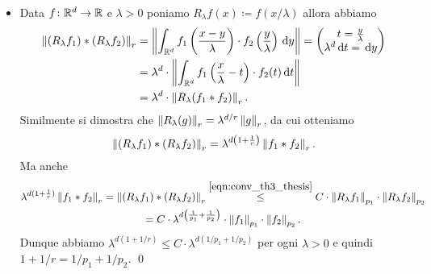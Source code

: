 \begin{itemize}
\begin{itemize}


		\item Data $f \colon \mathbb R^d \to \mathbb R$ e $\lambda > 0$ poniamo $R_{\lambda} f(x) \coloneqq f(x / \lambda)$ allora abbiamo
		\begin{align*}
			\left\lVert (R_\lambda f_1) \ast (R_\lambda f_2) \right\rVert_r
			& = \left\lVert \int_{\mathbb R^d} f_1 \left( \frac{x-y}{\lambda} \right) \cdot f_2\left( \frac{y}{\lambda} \right) \,\mathrm{d} y \right\rVert 
			= 
			\begin{pmatrix}
				t = \frac{y}{\lambda} \\
				\lambda^d \,\mathrm{d} t = \,\mathrm{d} y
			\end{pmatrix} \\
			& = \lambda^d \cdot \left\lVert \int_{\mathbb R^d} f_1 \left( \frac{x}{\lambda} - t \right) \cdot f_2(t) \,\mathrm{d} t \right\rVert \\
			& = \lambda^d \cdot \left\lVert R_\lambda (f_1 \ast f_2) \right\rVert_r.
		\end{align*}
		Similmente si dimostra che $\left\lVert R_\lambda(g) \right\rVert_r = \lambda^{d/r} \left\lVert g \right\rVert_r$, da cui otteniamo
		$$
			\left\lVert (R_\lambda f_1) \ast (R_\lambda f_2) \right\rVert_r 
			= \lambda^{d \left( 1 + \frac{1}{r} \right)} \left\lVert f_1 \ast f_2 \right\rVert_r.
		$$
		Ma anche
		\begin{multline*}
			\lambda^{d(1 + \frac{1}{r})} \left\lVert f_1 \ast f_2 \right\rVert_r
			= \left\lVert (R_\lambda f_1) \ast (R_\lambda f_2) \right\rVert_r 
			\overset{\eqref{eqn:conv_th3_thesis}}{\leq} C \cdot \left\lVert R_\lambda f_1 \right\rVert_{p_1} \cdot \left\lVert R_\lambda f_2 \right\rVert_{p_2} \\
			= C \cdot \lambda^{d \left( \frac{1}{p_1} + \frac{1}{p_2} \right)} \cdot \left\lVert f_1 \right\rVert_{p_1} \cdot \left\lVert f_2 \right\rVert_{p_2}.
		\end{multline*}
		Dunque abbiamo $\lambda^{d \left(1 + {1 / r} \right)} \leq C \cdot \lambda^{d\left( {1 / p_1} + {1 / p_2} \right)}$ per ogni $\lambda > 0$ e quindi $1 + {1 / r} = {1 / p_1} + {1 / p_2}$.
		\qed

	\end{itemize}

\end{itemize}

\vss


